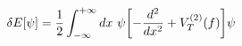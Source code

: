 \begin{equation}
\delta E [\psi ] = {{1} \over 2} \int_{-\infty}^{+\infty} dx ~
  \psi \biggl [ - {{d^2}\over {dx^2}} + V_T^{(2)} (f) \biggr ] \psi
\label{deltaEpsi}
\end{equation}

